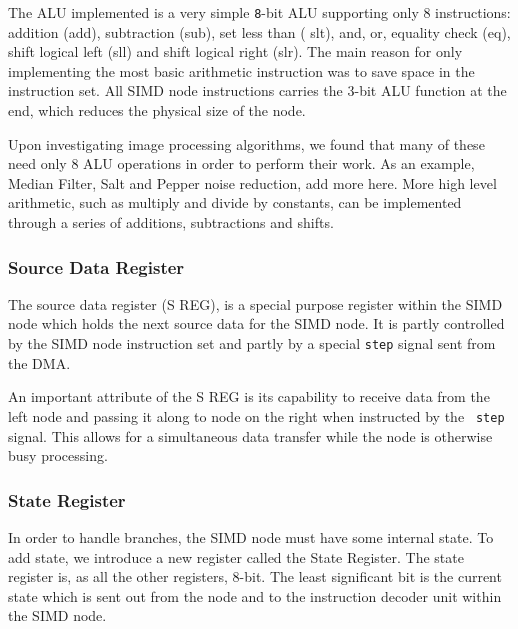 The \ac{ALU} implemented is a very simple {\tt 8}-bit \ac{ALU} supporting only 8
instructions: addition ({\sc add}), subtraction ({\sc sub}), set less than ({\sc
  slt}), {\sc and}, {\sc or}, equality check ({\sc eq}), shift logical left
({\sc sll}) and shift logical right ({\sc slr}). The main reason for only
implementing the most basic arithmetic instruction was to save space in the
instruction set. All \ac{SIMD} node instructions carries the 3-bit \ac{ALU}
function at the end, which reduces the physical size of the node.


Upon investigating image processing algorithms, we found that many of these need
only 8 \ac{ALU} operations in order to perform their work. As an example, Median
Filter, Salt and Pepper noise reduction, {\color{red} add more here}. More high
level arithmetic, such as multiply and divide by constants, can be implemented
through a series of additions, subtractions and shifts. 

\subsubsection{Source Data Register}
The source data register (S REG), is a special purpose register within the
\ac{SIMD} node which holds the next source data for the \ac{SIMD} node. It is
partly controlled by the \ac{SIMD} node instruction set and partly by a special
{\tt step} signal sent from the \ac{DMA}. 

An important attribute of the S REG is its capability to receive data from the
left node and passing it along to node on the right when instructed by the {\tt
  step} signal. This allows for a simultaneous data transfer while the node is
otherwise busy processing.

\subsubsection{State Register}
In order to handle branches, the \ac{SIMD} node must have some internal
state. To add state, we introduce a new register called the State Register. The
state register is, as all the other registers, 8-bit. The least significant bit
is the current state which is sent out from the node and to the instruction
decoder unit within the \ac{SIMD} node.

